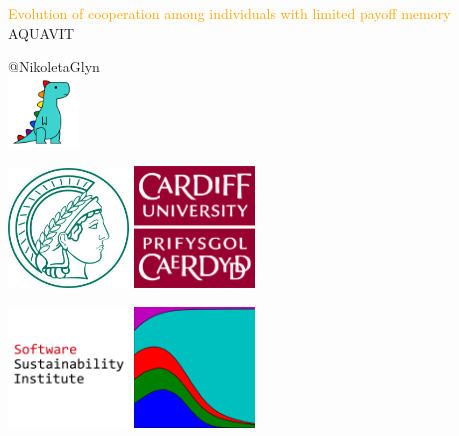 \documentclass{beamer}
\begin{document}
\begin{frame}
    \begin{center}
        \Large{\textcolor{orange}{Evolution of cooperation among individuals with limited payoff memory}} \\
        \vspace{.5cm}
        \large{AQUAVIT}

        \vspace{1cm}
        \normalsize{@NikoletaGlyn} \\
        \vspace{.5cm}
        \includegraphics[width=0.14\textwidth]{static/dyno.png}

    \end{center}
\end{frame}

\begin{frame}
    \begin{center}
    \includegraphics[width=0.24\textwidth]{static/mpi.jpg}\hspace{8pt}
    \includegraphics[width=0.24\textwidth]{static/cardiff_uni_logo.jpg}\vspace{8pt}

    \includegraphics[width=0.24\textwidth]{static/ssi-logo.png}\hspace{8pt}
    \includegraphics[width=0.24\textwidth]{static/axelrod-logo.png}
    \end{center}
\end{frame}
\end{document}
